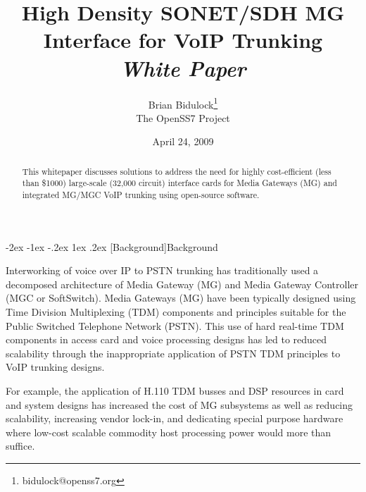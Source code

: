 \documentclass[letterpaper,final,notitlepage,twocolumn,10pt,twoside]{article}
\makeatletter
\renewcommand\section{\@startsection {section}{1}{\z@}%
                                   {-2ex \@plus -1ex \@minus -.2ex}%
                                   {1ex \@plus .2ex}%
                                   {\normalfont\large\bfseries}}
\makeatother
\begin{document}

\title{High Density SONET/SDH MG Interface for VoIP Trunking\\[0.5ex]
	{\large \textsl{White Paper}}}
\author{Brian Bidulock\thanks{bidulock@openss7.org}\\
	The OpenSS7 Project}
\date{April 24, 2009}
\maketitle

\begin{abstract}
This whitepaper discusses solutions to address the need for highly
cost-efficient (less than \$1000) large-scale (32,000 circuit) interface cards
for Media Gateways (MG) and integrated MG/MGC VoIP trunking using open-source
software.
\end{abstract}


\section[Background]{Background}


Interworking of voice over IP to PSTN trunking has traditionally used a
decomposed architecture of Media Gateway (MG) and Media Gateway Controller (MGC
or SoftSwitch).  Media Gateways (MG) have been typically designed using Time
Division Multiplexing (TDM) components and principles suitable for the Public
Switched Telephone Network (PSTN).  This use of hard real-time TDM components in
access card and voice processing designs has led to reduced scalability through
the inappropriate application of PSTN TDM principles to VoIP trunking designs.

For example, the application of H.110 TDM busses and DSP resources in card and
system designs has increased the cost of MG subsystems as well as reducing
scalability, increasing vendor lock-in, and dedicating special purpose hardware
where low-cost scalable commodity host processing power would more than suffice.
\end{document}

